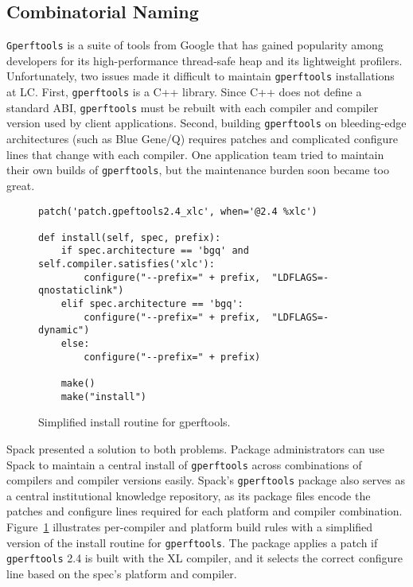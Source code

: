 
\subsection{Combinatorial Naming}
\label{sec:usecase-combinatorial}

{\tt Gperftools} is a suite of tools from Google that has gained popularity among
developers for its high-performance thread-safe heap and its lightweight profilers.
Unfortunately, two issues made it difficult to maintain {\tt gperftools} installations
at LC.  First, {\tt gperftools} is a C++ library.  Since C++ does not define a standard
ABI, {\tt gperftools} must be rebuilt with each compiler and compiler version used by client applications.  Second, building {\tt gperftools} on bleeding-edge architectures
(such as Blue Gene/Q) requires patches and complicated configure lines that
change with each compiler.  One application team tried to maintain their own
builds of {\tt gperftools}, but the maintenance burden soon became too great.

\begin{figure}
\begin{verbatim}
patch('patch.gpeftools2.4_xlc', when='@2.4 %xlc')

def install(self, spec, prefix):
    if spec.architecture == 'bgq' and self.compiler.satisfies('xlc'):
        configure("--prefix=" + prefix,  "LDFLAGS=-qnostaticlink")
    elif spec.architecture == 'bgq':
        configure("--prefix=" + prefix,  "LDFLAGS=-dynamic")
    else:
        configure("--prefix=" + prefix)

    make()
    make("install")
\end{verbatim}
  \caption{
    Simplified install routine for gperftools.
    \label{fig:gperftools}
  }
\end{figure}

Spack presented a solution to both problems.  Package administrators can use Spack to
maintain a central install of {\tt gperftools} across combinations of
compilers and compiler versions easily.  Spack's {\tt gperftools} package 
also serves as a central
institutional knowledge repository, as its package files encode
the patches and configure lines required for each platform and compiler combination.
%
Figure~\ref{fig:gperftools} illustrates per-compiler and platform build rules with
a simplified version of the install routine for {\tt gperftools}.
The package applies a patch if {\tt gperftools} 2.4 is built with the XL compiler,
and it selects the correct configure line based on the spec's platform and compiler.

